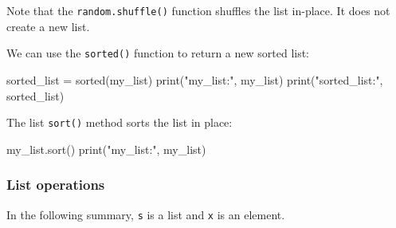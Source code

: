 \documentclass[12pt]{article} \newif\ifsolution\solutiontrue %
\begin{document}
Note that the \texttt{random.shuffle()} function shuffles the list
in-place. It does not create a new list.

We can use the \texttt{sorted()} function to return a new sorted list:

\begin{python}
sorted_list = sorted(my_list) print("my_list:", my_list) print("sorted_list:", sorted_list)
\end{python}

The list \texttt{sort()} method sorts the list in place:

\begin{python}
my_list.sort() print("my_list:", my_list)
\end{python}

\subsubsection{List operations}\label{list-operations}

In the following summary, \texttt{s} is a list and \texttt{x} is an
element.
\end{document}
